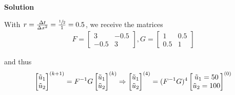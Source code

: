
\textbf{Solution}

With $r = \frac{\Delta t}{\Delta x^2} = \frac{\sfrac{1}{2}}{1} = 0.5$, we receive the matrices
\begin{align*}
	F = \begin{bmatrix}
		3 & -0.5 \\
		-0.5 & 3
	\end{bmatrix},
	G = \begin{bmatrix}
		1 & 0.5 \\
		0.5 & 1
	\end{bmatrix}
\end{align*}

and thus
\begin{align*}
	\begin{bmatrix}
		\tilde{u}_1 \\
		\tilde{u}_2
	\end{bmatrix}^{(k+1)}
	=
	F^{-1} G
	\begin{bmatrix}
		\tilde{u}_1 \\
		\tilde{u}_2
	\end{bmatrix}^{(k)}
	\Rightarrow
	\begin{bmatrix}
		\tilde{u}_1 \\
		\tilde{u}_2
	\end{bmatrix}^{(4)}
	=
	(F^{-1} G)^4
	\begin{bmatrix}
		\tilde{u}_1 = 50 \\
		\tilde{u}_2 = 100
	\end{bmatrix}^{(0)}
\end{align*}






